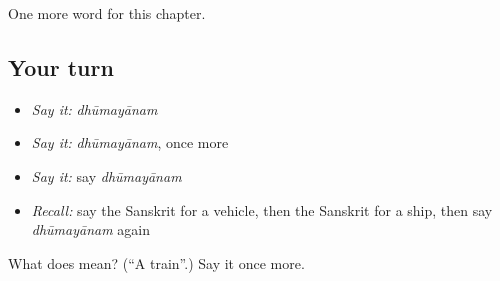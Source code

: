 \begin{grammarlens}[title={What you've built}]
One more word for this chapter.
\end{grammarlens}

\subsection*{Your turn}
\begin{itemize}
\raggedright
  \item \emph{Say it:} \emph{dhūmayānam}
  \item \emph{Say it:} \emph{dhūmayānam}, once more
  \item \emph{Say it:} say \emph{dhūmayānam}
  \item \emph{Recall:} say the Sanskrit for a vehicle, then the Sanskrit for a ship, then say \emph{dhūmayānam} again
\end{itemize}

\begin{tcolorbox}[breakable,colback=teal!4,colframe=teal!35!black,title={Before you move on}]
What does  mean? (\textquotedblleft{}A train\textquotedblright{}.) Say it once more.
\end{tcolorbox}

